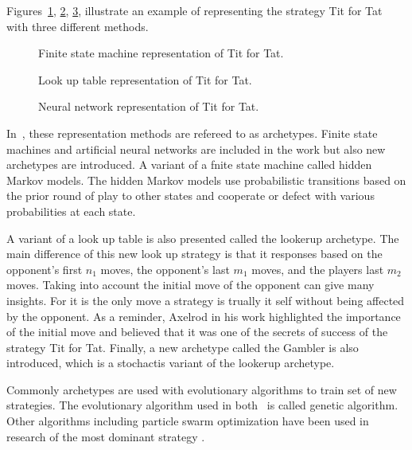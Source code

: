 \documentclass{article}
\begin{document}
Figures~\ref{fig:tit_for_tat_fsm}, \ref{fig:tit_for_tat_lu}, \ref{fig:tit_for_tat_neural},
illustrate an example of representing the strategy Tit for Tat with three different
methods.

\begin{figure}[!hbtp]
    \centering
    
    \caption{Finite state machine representation of Tit for Tat.}
    \label{fig:tit_for_tat_fsm}
\end{figure}

\begin{figure}[!hbtp]
    \centering
    
    \caption{Look up table representation of Tit for Tat.}
    \label{fig:tit_for_tat_lu}
\end{figure}

\begin{figure}[!hbtp]
    \centering
    
    \caption{Neural network representation of Tit for Tat.}
    \label{fig:tit_for_tat_neural}
\end{figure}

In~\cite{Knight2017}, these representation methods are refereed to as archetypes.
Finite state machines and artificial neural networks are included in the 
work but also new archetypes are introduced. A variant of a fnite state machine
called hidden Markov models. The hidden Markov models use probabilistic transitions
based on the prior round of play to other states and cooperate or defect with 
various probabilities at each state.

A variant of a look up table is also presented called the lookerup archetype. 
The main difference of this new look up strategy is that it responses based on 
the opponent’s first \(n_1\) moves, the opponent’s last \(m_1\) moves, and the 
players last \(m_2\) moves. Taking into account the initial move of the opponent
can give many insights. For it is the only move a strategy is trually it self 
without being affected by the opponent. As a reminder, Axelrod in his work 
highlighted the importance of the initial move and believed that it was one
of the secrets of success of the strategy Tit for Tat. Finally, a new archetype
called the Gambler is also introduced, which is a stochactis variant of the 
lookerup archetype.

Commonly archetypes are used with evolutionary algorithms to train set of 
new strategies. The evolutionary algorithm used in both~\cite{Axelrod1987,
Gaudesi2016} is called genetic algorithm. Other algorithms including particle
swarm optimization have been used in research of the most dominant strategy
\cite{Franken2005}.
\end{document}
